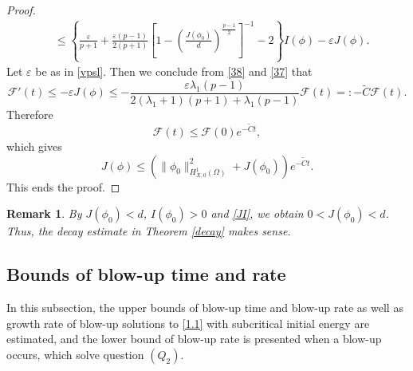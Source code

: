 \documentclass[11pt,a4paper]{article}
\numberwithin{equation}{section}
\newtheorem{remark}{Remark}[section]
\numberwithin{remark}{section}
\begin{document}
\begin{proof}
\begin{equation}
\begin{split}
&\leq\left\{\frac{\varepsilon}{p+1}+\frac{\varepsilon(p-1)}{2(p+1)}\left[1-\left(\frac{J(\phi_0)}{d}\right)^{\frac{p-1}{2}}\right]^{-1}-2\right\}I(\phi)
-\varepsilon J(\phi).
\end{split}\end{equation}
Let $\varepsilon$ be as in  \eqref{vpsl}. Then we conclude from \eqref{38} and \eqref{37} that
\begin{equation*}
\mathcal{F}'(t)\leq-\varepsilon J(\phi)
\leq -\frac{\varepsilon\lambda_1(p-1)}{2(\lambda_1+1)(p+1)+\lambda_1(p-1)}\mathcal{F}(t)=:-\tilde{C}\mathcal{F}(t).
\end{equation*}
Therefore
\begin{equation*}
\mathcal{F}(t)\leq \mathcal{F}(0)e^{-\tilde{C}t},
\end{equation*}
which gives
\begin{equation*}
J(\phi)\leq \left(\|\phi_0\|_{H_{X,0}^1(\Omega)}^2+J(\phi_0)\right)e^{-\tilde{C}t}.
\end{equation*}
This ends the proof.
\end{proof}


\begin{remark}
By $J(\phi_0)<d$, $I(\phi_0)>0$ and \eqref{JI}, we obtain $0<J(\phi_0)<d$. Thus, the decay estimate in Theorem \ref{decay} makes sense.
\end{remark}




\subsection{Bounds of blow-up time and rate}
\quad\quad In this subsection, the upper bounds of blow-up time and blow-up rate as well as growth rate of blow-up solutions to \eqref{1.1} with subcritical initial energy are estimated, and the lower bound of blow-up rate is presented when a blow-up occurs, which solve question $(Q_2)$.
\end{document}
